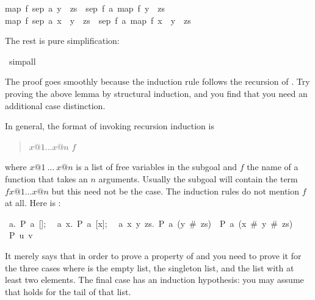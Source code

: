 \begin{isabellebody}
\begin{isamarkuptxt}
\begin{isabelle}
map\ f\ {\isacharparenleft}sep\ a\ {\isacharparenleft}y\ {\isacharhash}\ zs{\isacharparenright}{\isacharparenright}\ {\isacharequal}\ sep\ {\isacharparenleft}f\ a{\isacharparenright}\ {\isacharparenleft}map\ f\ {\isacharparenleft}y\ {\isacharhash}\ zs{\isacharparenright}{\isacharparenright}\ {\isasymLongrightarrow}\isanewline
{}map\ f\ {\isacharparenleft}sep\ a\ {\isacharparenleft}x\ {\isacharhash}\ y\ {\isacharhash}\ zs{\isacharparenright}{\isacharparenright}\ {\isacharequal}\ sep\ {\isacharparenleft}f\ a{\isacharparenright}\ {\isacharparenleft}map\ f\ {\isacharparenleft}x\ {\isacharhash}\ y\ {\isacharhash}\ zs{\isacharparenright}{\isacharparenright}%
\end{isabelle}
The rest is pure simplification:%
\end{isamarkuptxt}%
\isamarkuptrue%
\isamarkupfalse%
\ simp{\isacharunderscore}all\isanewline
{}\isamarkupfalse%
%
\endisatagproof
{\isafoldproof}%
%
\isadelimproof
%
\endisadelimproof
%
\begin{isamarkuptext}%
\noindent The proof goes smoothly because the induction rule
follows the recursion of .  Try proving the above lemma by
structural induction, and you find that you need an additional case
distinction.

In general, the format of invoking recursion induction is
\begin{quote}
 $x@1 \dots x@n$  $f$
\end{quote}%
where $x@1~\dots~x@n$ is a list of free variables in the subgoal and $f$ the
name of a function that takes an $n$ arguments. Usually the subgoal will
contain the term $f x@1 \dots x@n$ but this need not be the case. The
induction rules do not mention $f$ at all. Here is :
\begin{isabelle}
{\isasymlbrakk}~{\isasymAnd}a.~P~a~[];\isanewline
~~{\isasymAnd}a~x.~P~a~[x];\isanewline
~~{\isasymAnd}a~x~y~zs.~P~a~(y~\#~zs)~{\isasymLongrightarrow}~P~a~(x~\#~y~\#~zs){\isasymrbrakk}\isanewline
{\isasymLongrightarrow}~P~u~v%
\end{isabelle}
It merely says that in order to prove a property  of  and
 you need to prove it for the three cases where  is the
empty list, the singleton list, and the list with at least two elements.
The final case has an induction hypothesis:  you may assume that 
holds for the tail of that list.
%
\end{isamarkuptext}%
\isamarkuptrue%
%
\isadelimtheory
%
\endisadelimtheory
%
\isatagtheory
%
\endisatagtheory
{\isafoldtheory}%
%
\isadelimtheory
%
\endisadelimtheory
\end{isabellebody}%
